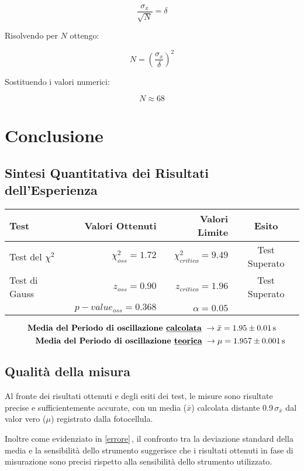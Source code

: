 \documentclass{article}
\begin{document}
\[\frac{\sigma_x}{\sqrt{N}} = \delta\]

\noindent Risolvendo per $N$ ottengo:

\[N = \left( \frac{\sigma_x}{\delta} \right)^2\]

\noindent Sostituendo i valori numerici:

\[N \approx 68 \]

\section{Conclusione}
\subsection{Sintesi Quantitativa dei Risultati dell'Esperienza}

\begin{table}[ht]
	\centering
	\begin{tabular}{|l|r|r|c|}
		\hline
		\textbf{Test} & \textbf{Valori Ottenuti} & \textbf{Valori Limite} & \textbf{Esito}  \\
		\hline
		Test del $\chi^2$ & $\chi^2_{oss} = 1.72$  & $\chi^2_{critico} = 9.49$ &  Test Superato \\
		\hline
		Test di Gauss & $z_{oss} = 0.90$ & $z_{critico} = 1.96$ & Test Superato \\
		& $p-value_{oss} = 0.368$ & $ \alpha = 0.05$ &   \\
		\hline
	\end{tabular}
\end{table}

\[ \text{\textbf{Media del Periodo di oscillazione \underline{calcolata}}  } \rightarrow \bar{x} = 1.95 \pm 0.01\,\text{s} \]
\[ \quad\quad \text{\textbf{Media del Periodo di oscillazione \underline{teorica}}    } \rightarrow \mu = 1.957 \pm 0.001\,\text{s} \]

\subsection{Qualità della misura}
Al fronte dei risultati ottenuti e degli esiti dei test, le misure sono risultate precise e sufficientemente accurate, con un media ($\bar{x}$) calcolata distante 0.9$\,\sigma_{\bar{x}}$ dal valor vero ($\mu$) registrato dalla fotocellula. 

Inoltre come evidenziato in \ref{errore}$\,$, il confronto tra la deviazione standard della media e la sensibilità dello strumento suggerisce che i risultati ottenuti in fase di misurazione sono precisi rispetto alla sensibilità dello strumento utilizzato.
\end{document}
